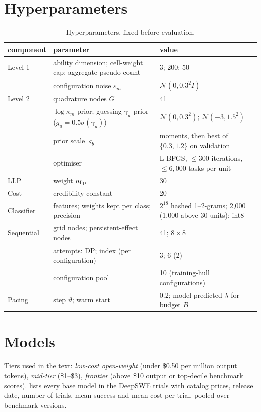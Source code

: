\documentclass[11pt,a4paper]{article}
\theoremstyle{definition}
\theoremstyle{remark}
\theoremstyle{definition}
\begin{document}
\section{Hyperparameters}
\label{app:hyper}
\begin{table}[h]
\centering\small
\begin{tabularx}{\textwidth}{llX}\toprule
component & parameter & value\\\midrule
Level 1 & ability dimension; cell-weight cap; aggregate pseudo-count & 3; 200; 50\\
 & configuration noise $\varepsilon_m$ & $\mathcal N(0,0.3^2I)$\\
Level 2 & quadrature nodes $G$ & 41\\
 & $\log\kappa_m$ prior; guessing $\gamma_u$ prior ($g_u=0.5\sigma(\gamma_u)$) & $\mathcal N(0,0.3^2)$; $\mathcal N(-3,1.5^2)$\\
 & prior scale $\varsigma_b$ & moments, then best of $\{0.3,1.2\}$ on validation\\
 & optimiser & L-BFGS, $\le300$ iterations, $\le6{,}000$ tasks per unit\\
LLP & weight $n_{\rm llp}$ & 30\\
Cost & credibility constant & 20\\
Classifier & features; weights kept per class; precision & $2^{18}$ hashed 1--2-grams; 2{,}000 (1{,}000 above 30 units); int8\\
Sequential & grid nodes; persistent-effect nodes & 41; $8\times8$\\
 & attempts: DP; index (per configuration) & 3; 6 (2)\\
 & configuration pool & 10 (training-hull configurations)\\
Pacing & step $\vartheta$; warm start & 0.2; model-predicted $\lambda$ for budget $B$\\
\bottomrule\end{tabularx}
\caption{Hyperparameters, fixed before evaluation.}
\end{table}

\section{Models}
\label{app:models}
Tiers used in the text: \emph{low-cost open-weight} (under \$0.50 per million output tokens), \emph{mid-tier} (\$1--\$3), \emph{frontier} (above \$10 output or top-decile benchmark scores).  lists every base model in the DeepSWE trials with catalog prices, release date, number of trials, mean success and mean cost per trial, pooled over benchmark versions.
\end{document}
